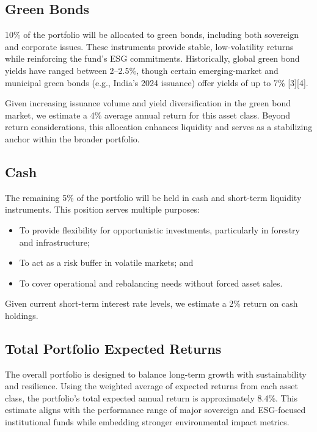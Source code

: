 \subsection*{Green Bonds}
10\% of the portfolio will be allocated to green bonds, including both sovereign and corporate issues. These instruments provide stable, low-volatility returns while reinforcing the fund’s ESG commitments. Historically, global green bond yields have ranged between 2–2.5\%, though certain emerging-market and municipal green bonds (e.g., India’s 2024 issuance) offer yields of up to 7\% [3][4].
\par Given increasing issuance volume and yield diversification in the green bond market, we estimate a 4\% average annual return for this asset class. Beyond return considerations, this allocation enhances liquidity and serves as a stabilizing anchor within the broader portfolio.

\subsection*{Cash}
The remaining 5\% of the portfolio will be held in cash and short-term liquidity instruments. This position serves multiple purposes: 
\begin{itemize}
    \item To provide flexibility for opportunistic investments, particularly in forestry and infrastructure;
    \item To act as a risk buffer in volatile markets; and 
    \item To cover operational and rebalancing needs without forced asset sales.
\end{itemize}
Given current short-term interest rate levels, we estimate a 2\% return on cash holdings.

\subsection*{Total Portfolio Expected Returns}
The overall portfolio is designed to balance long-term growth with sustainability and resilience. Using the weighted average of expected returns from each asset class, the portfolio’s total expected annual return is approximately 8.4\%. This estimate aligns with the performance range of major sovereign and ESG-focused institutional funds while embedding stronger environmental impact metrics. 


